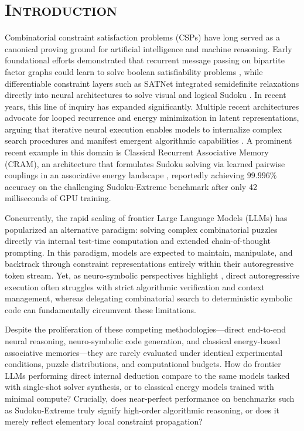 \documentclass{article} %
\begin{document}
\section{\textsc{Introduction}}
\label{sec:intro}
Combinatorial constraint satisfaction problems (CSPs) have long served as a canonical proving ground for artificial intelligence and machine reasoning. Early foundational efforts demonstrated that recurrent message passing on bipartite factor graphs could learn to solve boolean satisfiability problems \citep{Selsam2018LearningSat}, while differentiable constraint layers such as SATNet integrated semidefinite relaxations directly into neural architectures to solve visual and logical Sudoku \citep{Wang2019SatnetBridging}. In recent years, this line of inquiry has expanded significantly. Multiple recent architectures advocate for looped recurrence and energy minimization in latent representations, arguing that iterative neural execution enables models to internalize complex search procedures and manifest emergent algorithmic capabilities \citep{Chen2026EnergybasedReasoners}. A prominent recent example in this domain is Classical Recurrent Associative Memory (CRAM), an architecture that formulates Sudoku solving via learned pairwise couplings in an associative energy landscape \citep[cf.][]{Chen2026EnergybasedReasoners,Bresler2014EfficientlyLearning}, reportedly achieving $99.996\%$ accuracy on the challenging Sudoku-Extreme benchmark after only 42 milliseconds of GPU training.

Concurrently, the rapid scaling of frontier Large Language Models (LLMs) has popularized an alternative paradigm: solving complex combinatorial puzzles directly via internal test-time computation and extended chain-of-thought prompting. In this paradigm, models are expected to maintain, manipulate, and backtrack through constraint representations entirely within their autoregressive token stream. Yet, as neuro-symbolic perspectives highlight \citep{Yang2024NeurosymbolicArtificial}, direct autoregressive execution often struggles with strict algorithmic verification and context management, whereas delegating combinatorial search to deterministic symbolic code can fundamentally circumvent these limitations. 

Despite the proliferation of these competing methodologies—direct end-to-end neural reasoning, neuro-symbolic code generation, and classical energy-based associative memories—they are rarely evaluated under identical experimental conditions, puzzle distributions, and computational budgets. How do frontier LLMs performing direct internal deduction compare to the same models tasked with single-shot solver synthesis, or to classical energy models trained with minimal compute? Crucially, does near-perfect performance on benchmarks such as Sudoku-Extreme truly signify high-order algorithmic reasoning, or does it merely reflect elementary local constraint propagation?
\end{document}
